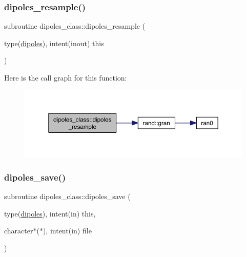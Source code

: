 \mbox{\label{namespacedipoles__class_a2d80cb493920a4619e0e83abfcb033f6}} 
\subsubsection{\texorpdfstring{dipoles\+\_\+resample()}{dipoles\_resample()}}
{\footnotesize\ttfamily subroutine dipoles\+\_\+class\+::dipoles\+\_\+resample (\begin{DoxyParamCaption}\item[{type(\hyperlink{structdipoles__class_1_1dipoles}{dipoles}), intent(inout)}]{this }\end{DoxyParamCaption})\hspace{0.3cm}{\ttfamily [private]}}

Here is the call graph for this function\+:\nopagebreak
\begin{figure}[H]
\begin{center}
\leavevmode
\includegraphics[width=350pt]{namespacedipoles__class_a2d80cb493920a4619e0e83abfcb033f6_cgraph}
\end{center}
\end{figure}
\mbox{\label{namespacedipoles__class_a9ab428011961577796577f9cdeb032b4}} 
\subsubsection{\texorpdfstring{dipoles\+\_\+save()}{dipoles\_save()}}
{\footnotesize\ttfamily subroutine dipoles\+\_\+class\+::dipoles\+\_\+save (\begin{DoxyParamCaption}\item[{type(\hyperlink{structdipoles__class_1_1dipoles}{dipoles}), intent(in)}]{this,  }\item[{character$\ast$($\ast$), intent(in)}]{file }\end{DoxyParamCaption})\hspace{0.3cm}{\ttfamily [private]}}

